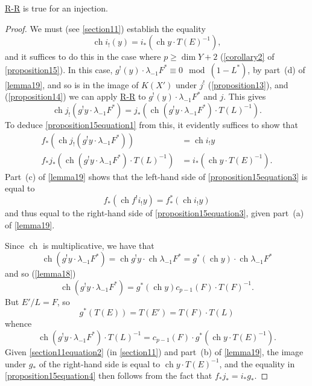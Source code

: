 \documentclass{article}
\theoremstyle{plain}
\newenvironment{proposition}[1]
    {\renewcommand\theinnercustomproposition{#1}\innercustomproposition}
    {\endinnercustomproposition}
\theoremstyle{definition}
\renewcommand{\geq}{\geqslant}
\DeclareMathOperator{\ch}{ch}
\newcommand{\oldpage}[1]{\marginpar{\footnotesize$\Big\vert$ \textit{p.~#1}}}
\begin{document}
\oldpage{129}
\begin{proposition}{15}
\label{proposition15}
  \hyperref[theoremriemannroch]{R-R} is true for an injection.
\end{proposition}

\begin{proof}
  We must (see \cref{section11}) establish the equality
  \[
  \label{proposition15equation1}
    \ch i_!(y) = i_*(\ch y\cdot T(E)^{-1}),
    \tag{1}
  \]
  and it suffices to do this in the case where $p\geq\dim Y+2$ (\cref{corollary2} of \cref{proposition15}).
  In this case, $g^!(y)\cdot\lambda_{-1}F^*\equiv0\mod(1-L^*)$, by part~(d) of \cref{lemma19}, and so is in the image of $K(X')$ under $j^!$ (\cref{proposition13}), and (\cref{proposition14}) we can apply \hyperref[theoremriemannroch]{R-R} to $g^!(y)\cdot\lambda_{-1}F^*$ and $j$.
  This gives
  \[
  \label{proposition15equation2}
    \ch j_!(g^! y\cdot\lambda_{-1}F^*)
    = j_*(\ch(g^! y\cdot \lambda_{-1}F^*)\cdot T(L)^{-1}).
    \tag{2}
  \]
  To deduce \cref{proposition15equation1} from this, it evidently suffices to show that
  \begin{align*}
  \label{proposition15equation3}
    f_*(\ch j_!(g^!y\cdot\lambda_{-1}F^*)) &= \ch i_! y
    \tag{3}
  \\
  \label{proposition15equation4}f_*j_*(\ch(g^!y\cdot\lambda_{-1}F^*)\cdot T(L)^{-1}) &= i_*(\ch y\cdot T(E)^{-1}).
    \tag{4}
  \end{align*}
  Part~(c) of \cref{lemma19} shows that the left-hand side of \cref{proposition15equation3} is equal to
  \[
    f_*(\ch f^!i_!y) = f_*^*(\ch i_!y)
  \]
  and thus equal to the right-hand side of \cref{proposition15equation3}, given part~(a) of \cref{lemma19}.

  Since $\ch$ is multiplicative, we have that
  \[
    \ch(g^!y\cdot\lambda_{-1}F^*)
    = \ch g^!y\cdot\ch\lambda_{-1}F^*
    = g^*(\ch y)\cdot\ch\lambda_{-1}F^*
  \]
  and so (\cref{lemma18})
  \[
    \ch(g^!y\cdot\lambda_{-1}F^*) = g^*(\ch y)c_{p-1}(F)\cdot T(F)^{-1}.
  \]
  But $E'/L=F$, so
  \[
    g^*(T(E)) = T(E') = T(F)\cdot T(L)
  \]
  whence
  \[
    \ch(g^!y\cdot\lambda_{-1}F^*)\cdot T(L)^{-1} = c_{p-1}(F)\cdot g^*(\ch y\cdot T(E)^{-1}).
  \]
  Given \cref{section11equation2} (in \cref{section11}) and part~(b) of \cref{lemma19}, the image under $g_*$ of the right-hand side is equal to $\ch y\cdot T(E)^{-1}$, and the equality in \cref{proposition15equation4} then follows from the fact that $f_*j_*=i_*g_*$.
\end{proof}
\end{document}
